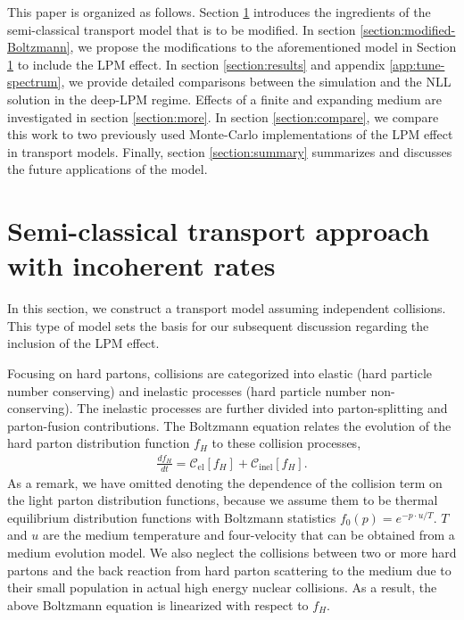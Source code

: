 \documentclass[aps, prc, reprint, amsmath, groupedaddress, nofootinbib]{revtex4-1}
\begin{document}
This paper is organized as follows. 
Section \ref{section:Boltzmann} introduces the ingredients of the semi-classical transport model that is to be modified.
In section \ref{section:modified-Boltzmann}, we propose the modifications to the aforementioned model in Section \ref{section:Boltzmann} to include the LPM effect.
In section \ref{section:results} and appendix \ref{app:tune-spectrum}, we provide detailed comparisons between the simulation and the NLL solution in the deep-LPM regime.
Effects of a finite and expanding medium are investigated in section \ref{section:more}.
In section \ref{section:compare}, we compare this work to two previously used Monte-Carlo implementations of the LPM effect in transport models.
Finally, section \ref{section:summary} summarizes and discusses the future applications of the model.



\section{Semi-classical transport approach with incoherent rates}\label{section:Boltzmann}
In this section, we construct a transport model assuming independent collisions. This type of model sets the basis for our subsequent discussion regarding the inclusion of the LPM effect.

Focusing on hard partons, collisions are categorized into elastic (hard particle number conserving) and inelastic processes (hard particle number non-conserving). 
The inelastic processes are further divided into parton-splitting and parton-fusion contributions. 
The Boltzmann equation relates the evolution of the hard parton distribution function $f_H$ to these collision processes,
\begin{eqnarray}
\frac{df_H}{dt} = \mathcal{C}_{\textrm{el}}[f_H] + \mathcal{C}_{\textrm{inel}}[f_H].
\end{eqnarray}
As a remark, we have omitted denoting the dependence of the collision term on the light parton distribution functions, because we assume them to be thermal equilibrium distribution functions with Boltzmann statistics $f_0(p) = e^{-p\cdot u/T}$. 
$T$ and $u$ are the medium temperature and four-velocity that can be obtained from a medium evolution model. 
We also neglect the collisions between two or more hard partons and the back reaction from hard parton scattering to the medium due to their small population in actual high energy nuclear collisions.
As a result, the above Boltzmann equation is linearized with respect to $f_H$.
\end{document}
